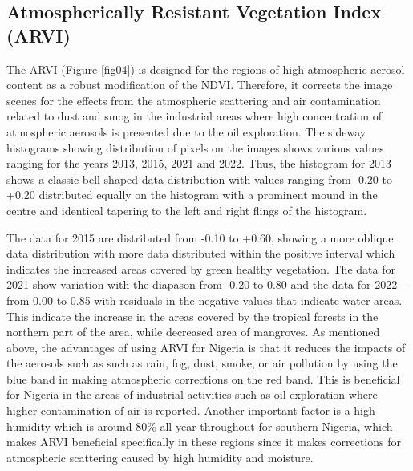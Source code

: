 \documentclass[jmse,article,submit,pdftex,moreauthors]{Definitions/mdpi}
\begin{document}
\subsection{Atmospherically Resistant Vegetation Index (ARVI)}

The ARVI (Figure \ref{fig04}) is designed for the regions of high atmospheric aerosol content as a robust modification of the NDVI. Therefore, it corrects the image scenes for the effects from the atmospheric scattering and air contamination related to dust and smog in the industrial areas where high concentration of atmospheric aerosols is presented due to the oil exploration. The sideway histograms showing distribution of pixels on the images shows various values ranging for the years 2013, 2015, 2021 and 2022. Thus, the histogram for 2013 shows a classic bell-shaped data distribution with values ranging from -0.20 to +0.20 distributed equally on the histogram with a prominent mound in the centre and identical tapering to the left and right flings of the histogram. 

The data for 2015 are distributed from -0.10 to +0.60, showing a more oblique data distribution with more data distributed within the positive interval which indicates the increased areas covered by green healthy vegetation. The data for 2021 show variation with the diapason from -0.20 to 0.80 and the data for 2022 -- from 0.00 to 0.85 with residuals in the negative values that indicate water areas. This indicate the increase in the areas covered by the tropical forests in the northern part of the area, while decreased area of mangroves. As mentioned above, the advantages of using ARVI for Nigeria is that it reduces the impacts of the aerosols such as such as rain, fog, dust, smoke, or air pollution by using the blue band in making atmospheric corrections on the red band. This is beneficial for Nigeria in the areas of industrial activities such as oil exploration where higher contamination of air is reported. Another important factor is a high humidity which is around 80\% all year throughout for southern Nigeria, which makes ARVI beneficial specifically in these regions since it makes corrections for atmospheric scattering caused by high humidity and moisture.
\end{document}
